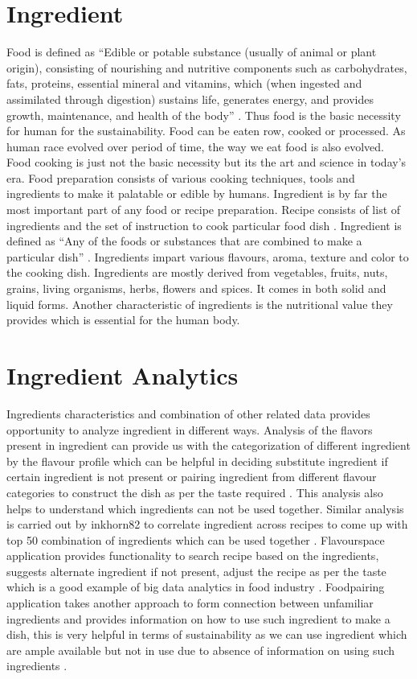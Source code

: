 \documentclass[sigconf]{acmart}
\begin{document}
\section{Ingredient}
Food is defined as ``Edible or potable substance (usually of animal or plant origin), consisting of nourishing and nutritive components such as carbohydrates, fats, proteins, essential mineral and vitamins, which (when ingested and assimilated through digestion) sustains life, generates energy, and provides growth, maintenance, and health of the body'' \cite{www-businessdictionary}. Thus food is the basic necessity for human for the sustainability. Food can be eaten row, cooked or processed. As human race evolved over period of time, the way we eat food is also evolved. Food cooking is just not the basic necessity but its the art and science in today's era. Food preparation consists of various cooking techniques, tools and ingredients to make it palatable or edible by humans. Ingredient is by far the most important part of any food or recipe preparation. Recipe consists of list of ingredients and the set of instruction to cook particular food dish \cite{www-collinsdictionary}. Ingredient is defined as ``Any of the foods or substances that are combined to make a particular dish'' \cite{www-oxforddictionaries}. Ingredients impart various flavours, aroma, texture and color to the cooking dish. Ingredients are mostly derived from vegetables, fruits, nuts, grains, living organisms, herbs, flowers and spices. It comes in both solid and liquid forms. Another characteristic of ingredients is the nutritional value they provides which is essential for the human body.

\section{Ingredient Analytics}
Ingredients characteristics and combination of other related data provides opportunity to analyze ingredient in different ways. Analysis of the flavors present in ingredient can provide us with the categorization of different ingredient by the flavour profile which can be helpful in deciding substitute ingredient if certain ingredient is not present or pairing ingredient from different flavour categories to construct the dish as per the taste required \cite{Ahn2011}. This analysis also helps to understand which ingredients can not be used together. Similar analysis is carried out by inkhorn82 to correlate ingredient across recipes to come up with top 50 combination of ingredients which can be used together \cite{www-r-bloggers}. Flavourspace application provides functionality to search recipe based on the ingredients, suggests alternate ingredient if not present, adjust the recipe as per the taste which is a good example of big data analytics in food industry \cite{www-thecul}. Foodpairing application takes another approach to form connection between unfamiliar ingredients and provides information on how to use such ingredient to make a dish, this is very helpful in terms of sustainability as we can use ingredient which are ample available but not in use due to absence of information on using such ingredients \cite{www-foodtech}.
\end{document}
